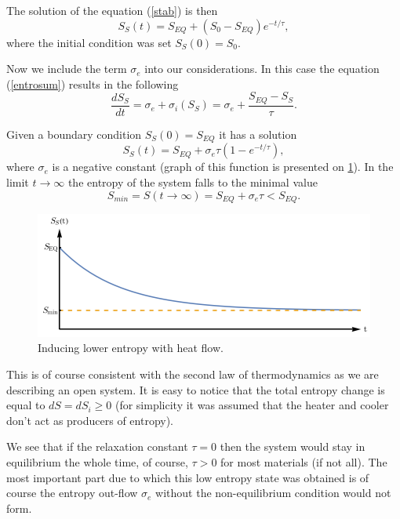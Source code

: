 \documentclass[a4paper,12pt]{article}
\begin{document}
The solution of the equation (\ref{stab}) is then
\begin{equation}
S_S(t) =S_{EQ}+(S_0-S_{EQ})e^{-t/\tau}, 
\end{equation}
where the initial condition was set $S_S(0)=S_0$.


Now we include the term $\sigma_e$ into our considerations.
In this case the equation (\ref{entrosum}) results in the following 
\begin{equation}
\frac{dS_S}{dt}=\sigma_e + \sigma_i\left(S_S\right)=\sigma_e +\frac{S_{EQ}-S_S}{\tau}.
\label{dSSdt}
\end{equation} 

 
Given a boundary condition $S_S(0) =S_{EQ}$ it has a solution
\begin{equation}
S_S(t)=S_{EQ}+\sigma_e\tau \left(1-e^{-t/\tau }\right),
\end{equation} 
where $\sigma_e$ is a negative constant (graph of this function is presented on \ref{Fig4}). 
In the limit $t\rightarrow \infty$ the entropy of the system falls to the minimal value
\begin{equation}
S_{min}=S(t\rightarrow \infty) =S_{EQ}+\sigma_e \tau < S_{EQ}.
\end{equation}

\begin{figure}[ht!]
\centering \includegraphics[width=12cm]{wykres3} 
\caption{Inducing lower entropy with heat flow.}
\label{Fig4} 
\end{figure}

This is of course consistent with the second law of thermodynamics as we are describing an open system.
It is easy to notice that the total entropy change is equal to $dS=dS_i \geq 0$ (for simplicity it was assumed that the heater and cooler don't act as producers of entropy).

We see that if the relaxation constant $\tau = 0$ then the system would stay in equilibrium the whole time, of course, $\tau > 0$ for most materials (if not all). The most important part due to which this low entropy state was obtained is of course the entropy out-flow $\sigma_e$ without the non-equilibrium condition would not form.
\end{document}
